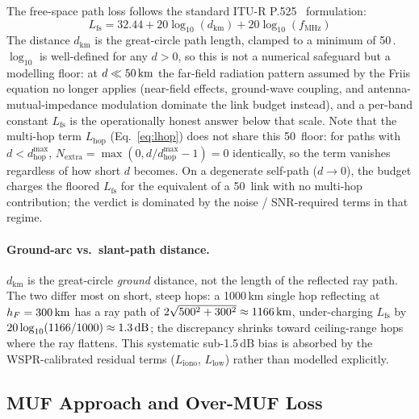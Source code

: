 \documentclass[11pt,a4paper]{article}
\newcommand{\SI}[2]{#1\,\text{#2}}
\newcommand{\si}[1]{\text{#1}}
\newcommand{\dB}{\text{dB}}
\newcommand{\km}{\text{km}}
\begin{document}
The free-space path loss follows the standard ITU-R
P.525~\cite{itup525} formulation:
\begin{equation}\label{eq:fspl}
  L_{\text{fs}} = 32.44 + 20\log_{10}(d_{\text{km}})
                        + 20\log_{10}(f_{\text{MHz}})
\end{equation}
The distance $d_{\text{km}}$ is the great-circle path length,
clamped to a minimum of \SI{50}{\km}.  $\log_{10}$ is well-defined
for any $d > 0$, so this is not a numerical safeguard but a
modelling floor: at $d \ll \SI{50}{\km}$ the far-field radiation
pattern assumed by the Friis equation no longer applies (near-field
effects, ground-wave coupling, and antenna-mutual-impedance
modulation dominate the link budget instead), and a per-band
constant $L_{\text{fs}}$ is the operationally honest answer
below that scale.  Note that the multi-hop term
$L_{\text{hop}}$ (Eq.~\ref{eq:lhop}) does not share this
\SI{50}{\km} floor: for paths with $d < d_{\text{hop}}^{\max}$,
$N_{\text{extra}} = \max(0, d/d_{\text{hop}}^{\max} - 1) = 0$
identically, so the term vanishes regardless of how short $d$
becomes.  On a degenerate self-path ($d \to 0$), the budget
charges the floored $L_{\text{fs}}$ for the equivalent of a
50\,\si{\km} link with no multi-hop contribution; the
verdict is dominated by the noise / SNR-required terms in
that regime.

\paragraph{Ground-arc vs.\ slant-path distance.}  $d_{\text{km}}$
is the great-circle \emph{ground} distance, not the length of the
reflected ray path.  The two differ most on short, steep hops: a
1000\,km single hop reflecting at $h_F = \SI{300}{\km}$ has a ray
path of $2\sqrt{500^2 + 300^2} \approx \SI{1166}{\km}$,
under-charging $L_{\text{fs}}$ by
$20\log_{10}(1166/1000) \approx \SI{1.3}{\dB}$; the discrepancy
shrinks toward ceiling-range hops where the ray flattens.  This
systematic sub-1.5\,dB bias is absorbed by the WSPR-calibrated
residual terms ($L_{\text{iono}}$, $L_{\text{low}}$) rather than
modelled explicitly.

\subsection{MUF Approach and Over-MUF Loss}\label{sec:lmuf}
\end{document}
